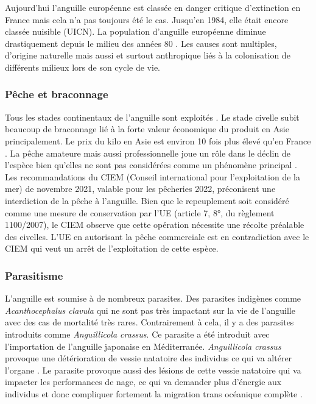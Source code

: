 \documentclass[11pt,titlepage,twoside]{article}\usepackage[]{graphicx}\usepackage[table]{xcolor}
\begin{document}
Aujourd’hui l’anguille européenne est classée en danger critique d’extinction en France mais cela n’a pas toujours été le cas. Jusqu’en 1984, elle était encore classée nuisible (UICN). La population d’anguille européenne diminue drastiquement depuis le milieu des années 80 \citep{brusle_anguille_1994}. Les causes sont multiples, d’origine naturelle mais aussi et surtout anthropique liés à la colonisation de différents milieux lors de son cycle de vie.


\subsubsection{Pêche et braconnage }

Tous les stades continentaux de l’anguille sont exploités \citep{dekker_worldwide_2003}. Le stade civelle subit beaucoup de braconnage lié à la forte valeur économique du produit en Asie principalement. Le prix du kilo en Asie est environ 10 fois plus élevé qu’en France \citep{adam_anguille_2008}. La pêche amateure mais aussi professionnelle joue un rôle dans le déclin de l’espèce bien qu’elles ne sont pas considérées comme un phénomène principal \citep{prouzet_etude_2003}. 
Les recommandations du CIEM (Conseil international pour l’exploitation de la mer) de novembre 2021, valable pour les pêcheries 2022, préconisent une interdiction de la pêche à l’anguille. Bien que le repeuplement soit considéré comme une mesure de conservation par l’UE (article 7, 8°, du règlement 1100/2007), le CIEM observe que cette opération nécessite une récolte préalable des civelles. L’UE en autorisant la pêche commerciale est en contradiction avec le CIEM qui veut un arrêt de l’exploitation de cette espèce. 

\subsubsection{Parasitisme}

L’anguille est soumise à de nombreux parasites. Des parasites indigènes comme \textit{Acanthocephalus clavula} qui ne sont pas très impactant sur la vie de l’anguille avec des cas de mortalité très rares. Contrairement à cela, il y a des parasites introduits comme \textit{Anguillicola crassus}. Ce parasite a été introduit avec l’importation de l’anguille japonaise en Méditerranée. \textit{Anguillicola crassus} provoque une détérioration de vessie natatoire des individus ce qui va altérer l’organe \citep{kirk_effect_2000}. Le parasite provoque aussi des lésions de cette vessie natatoire qui va impacter les performances de nage, ce qui va demander plus d’énergie aux individus et donc compliquer fortement la migration trans océanique complète \citep{kirk_impact_2003}. 
\end{document}
